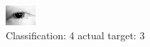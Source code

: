 \begin{figure}[h!]
\begin{center}
\includegraphics[width=0.60\columnwidth]{figures/ID21_class_4_target_3.png}
\end{center}
\caption{ Classification: 4 actual target: 3}
\label{fig:ID21_class_4_target_3}
\end{figure}
